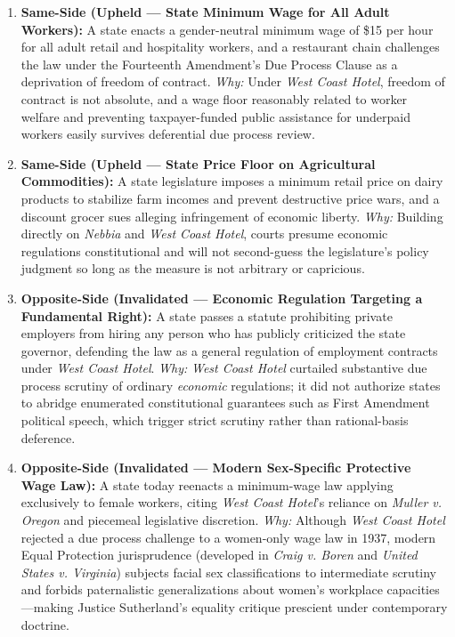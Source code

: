 \documentclass[12pt]{article}
\begin{document}
\begin{enumerate}
\item \textbf{Same-Side (Upheld --- State Minimum Wage for All Adult Workers):} A state enacts a gender-neutral minimum wage of \$15 per hour for all adult retail and hospitality workers, and a restaurant chain challenges the law under the Fourteenth Amendment's Due Process Clause as a deprivation of freedom of contract. \emph{Why:} Under \textit{West Coast Hotel}, freedom of contract is not absolute, and a wage floor reasonably related to worker welfare and preventing taxpayer-funded public assistance for underpaid workers easily survives deferential due process review.

\item \textbf{Same-Side (Upheld --- State Price Floor on Agricultural Commodities):} A state legislature imposes a minimum retail price on dairy products to stabilize farm incomes and prevent destructive price wars, and a discount grocer sues alleging infringement of economic liberty. \emph{Why:} Building directly on \textit{Nebbia} and \textit{West Coast Hotel}, courts presume economic regulations constitutional and will not second-guess the legislature's policy judgment so long as the measure is not arbitrary or capricious.

\item \textbf{Opposite-Side (Invalidated --- Economic Regulation Targeting a Fundamental Right):} A state passes a statute prohibiting private employers from hiring any person who has publicly criticized the state governor, defending the law as a general regulation of employment contracts under \textit{West Coast Hotel}. \emph{Why:} \textit{West Coast Hotel} curtailed substantive due process scrutiny of ordinary \emph{economic} regulations; it did not authorize states to abridge enumerated constitutional guarantees such as First Amendment political speech, which trigger strict scrutiny rather than rational-basis deference.

\item \textbf{Opposite-Side (Invalidated --- Modern Sex-Specific Protective Wage Law):} A state today reenacts a minimum-wage law applying exclusively to female workers, citing \textit{West Coast Hotel}'s reliance on \textit{Muller v. Oregon} and piecemeal legislative discretion. \emph{Why:} Although \textit{West Coast Hotel} rejected a due process challenge to a women-only wage law in 1937, modern Equal Protection jurisprudence (developed in \textit{Craig v. Boren} and \textit{United States v. Virginia}) subjects facial sex classifications to intermediate scrutiny and forbids paternalistic generalizations about women's workplace capacities---making Justice Sutherland's equality critique prescient under contemporary doctrine.


\end{enumerate}
\end{document}
